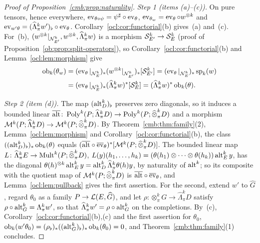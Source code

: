 \begin{proof}[Proof of Proposition~\ref{cmb:prop:naturality}]
\emph{Step 1 (items (a)--(c)).} On pure tensors, hence everywhere, $\operatorname{ev}_{\theta\circ\psi}=\psi^\sharp\circ\operatorname{ev}_\theta$,
$\operatorname{ev}_{\theta_w}=\operatorname{ev}_\theta\circ w^{\otimes k}$ and $\operatorname{ev}_{w'\theta}=(\widehat\Lambda^k_\pi w')_\flat\circ\operatorname{ev}_\theta$.
Corollary~\ref{ocl:cor:functorial}(b) gives~(a) and~(c). For~(b), $(w^{\otimes k}|_{\mathcal N^k_{E'}},w^{\otimes
k},\widehat\Lambda^k_\pi w)$ is a morphism $\mathcal S^k_{E'}\to\mathcal S^k_E$ (proof of Proposition~\ref{ob:prop:split-operators}),
so Corollary~\ref{ocl:cor:functorial}(b) and Lemma~\ref{ocl:lem:morphism} give
\begin{align*}
 \operatorname{ob}_k(\theta_w)&=(\operatorname{ev}_\theta|_{\mathcal N^k_E})_*(w^{\otimes k}|_{\mathcal N^k_{E'}})_*[\mathcal S^k_{E'}]
 =(\operatorname{ev}_\theta|_{\mathcal N^k_E})_*\operatorname{sp}_k(w)\\
 &=(\operatorname{ev}_\theta|_{\mathcal N^k_E})_*(\widehat\Lambda^k_\pi w)^*[\mathcal S^k_E]=(\widehat\Lambda^k_\pi w)^*\operatorname{ob}_k(\theta).
\end{align*}

\emph{Step 2 (item (d)).} The map $(\operatorname{alt}^k_D)_\flat$ preserves zero diagonals, so it induces a bounded linear
$\overline{\operatorname{alt}}\colon\operatorname{Poly}^k(P;\widehat\Lambda^k_\pi D)\to\operatorname{Poly}^k(P;\widehat\otimes^k_\pi D)$ and a morphism
$\mathcal M^k(P;\widehat\Lambda^k_\pi D)\to\mathcal M^k(P;\widehat\otimes^k_\pi D)$. By Theorem~\ref{cmb:thm:family}(2),
Lemma~\ref{ocl:lem:morphism} and Corollary~\ref{ocl:cor:functorial}(b), the class
$((\operatorname{alt}^k_D)_\flat)_*\operatorname{ob}_k(\theta)$ equals $(\overline{\operatorname{alt}}\circ\overline{\operatorname{ev}}_\theta)^*[\mathcal M^k(P;\widehat\otimes^k_\pi D)]$. The
bounded linear map $L\colon\widehat\Lambda^k_\pi E\to\operatorname{Mult}^k(P;\widehat\otimes^k_\pi D)$,
$L(y)(h_1,\dots,h_k)=(\theta(h_1)\otimes\dots\otimes\theta(h_k))\operatorname{alt}^k_Ey$, has the diagonal
$\theta(h)^{\otimes k}\operatorname{alt}^k_Ey=\operatorname{alt}^k_D\widehat\Lambda^k_\pi\theta(h)y$, by naturality of $\operatorname{alt}^k$; so its composite
with the quotient map of $\mathcal M^k(P;\widehat\otimes^k_\pi D)$ is $\overline{\operatorname{alt}}\circ\overline{\operatorname{ev}}_\theta$, and
Lemma~\ref{ocl:lem:pullback} gives the first assertion. For the second, extend $w'$ to $\widehat G$, regard $\theta_0$ as
a family $P\to\mathcal L(E,\widehat G)$, and let $\rho\colon\otimes^k_\pi G\to\widehat\Lambda^k_\pi D$ satisfy
$\rho\circ\operatorname{alt}^k_G=\Lambda^k_\pi w'$, so that $\widehat\Lambda^k_\pi w'=\rho\circ\operatorname{alt}^k_G$ on the completions. By~(c),
Corollary~\ref{ocl:cor:functorial}(b),(c) and the first assertion for $\theta_0$,
$\operatorname{ob}_k(w'\theta_0)=(\rho_\flat)_*((\operatorname{alt}^k_G)_\flat)_*\operatorname{ob}_k(\theta_0)=0$, and Theorem~\ref{cmb:thm:family}(1) concludes.
\end{proof}

